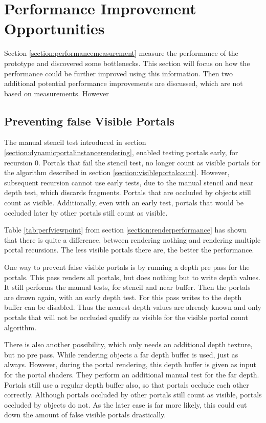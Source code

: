 \chapter{Performance Improvement Opportunities}
\label{section:performanceimprovements}

Section \ref{section:performancemeasurement} measure the performance of the prototype and discovered some bottlenecks. This section will focus on how the performance could be further improved using this information. Then two additional potential performance improvements are discussed, which are not based on measurements. However

\section{Preventing false Visible Portals}
\label{section:falsevisible}
The manual stencil test introduced in section \ref{section:dynamicportalinstancerendering}, enabled testing portals early, for recursion 0. Portals that fail the stencil test, no longer count as visible portals for the algorithm described in section \ref{section:visibleportalcount}. However, subsequent recursion cannot use early tests, due to the manual stencil and near depth test, which discards fragments. Portals that are occluded by objects still count as visible. Additionally, even with an early test, portals that would be occluded later by other portals still count as visible.

Table \ref{tab:perfviewpoint} from section \ref{section:renderperformance} has shown that there is quite a difference, between rendering nothing and rendering multiple portal recursions. The less visible portals there are, the better the performance.


One way to prevent false visible portals is by running a depth pre pass for the portals. This pass renders all portals, but does nothing but to write depth values. It still performs the manual tests, for stencil and near buffer. Then the portals are drawn again, with an early depth test. For this pass writes to the depth buffer can be disabled. Thus the nearest depth values are already known and only portals that will not be occluded qualify as visible for the visible portal count algorithm.

There is also another possibility, which only needs an additional depth texture, but no pre pass. While  rendering objects a far depth buffer is used, just as always. However, during the portal rendering, this depth buffer is given as input for the portal shaders. They perform an additional manual test for the far depth. Portals still use a regular depth buffer also, so that portals occlude each other correctly. Although portals occluded by other portals still count as visible, portals occluded by objects do not. As the later case is far more likely, this could cut down the amount of false visible portals drastically.




